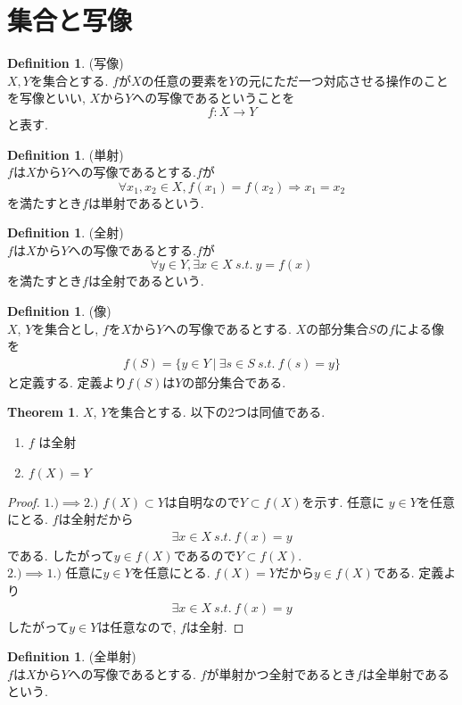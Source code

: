\documentclass[11pt, a4paper, dvipdfmx]{jsbook}
\theoremstyle{definition}
\newtheorem{Definition+}[Axiom+]{Definition}
\newtheorem{Theorem+}[Axiom+]{Theorem}
\begin{document}
\section{集合と写像}
\begin{Definition+}(写像)\\
  $X, Y$を集合とする.
  $f$が$X$の任意の要素を$Y$の元にただ一つ対応させる操作のことを写像といい, $X$から$Y$への写像であるということを
  \begin{equation*}
    f : X \to Y
  \end{equation*}
  と表す.
\end{Definition+}
\begin{Definition+}(単射)\\
  $f$は$X$から$Y$への写像であるとする.$f$が
  \begin{equation*}
    \forall x_{1}, x_{2}\in X, f(x_{1}) = f(x_{2}) \Longrightarrow x_{1} = x_{2}
  \end{equation*}
  を満たすとき$f$は単射であるという.
\end{Definition+}
\begin{Definition+}(全射)\\
  $f$は$X$から$Y$への写像であるとする.$f$が
  \begin{equation*}
    \forall y \in Y, \exists x\in X ~s.t.~ y = f(x)
  \end{equation*}
  を満たすとき$f$は全射であるという.
\end{Definition+}
\begin{Definition+}(像)\\
  $X$, $Y$を集合とし, $f$を$X$から$Y$への写像であるとする. $X$の部分集合$S$の$f$による像を
  \begin{align*}
    f(S) = \{y\in Y~|~ \exists s\in S~s.t.~ f(s) = y\}
  \end{align*}
  と定義する. 定義より$f(S)$は$Y$の部分集合である.
\end{Definition+}
\begin{Theorem+}
  $X$, $Y$を集合とする. 以下の2つは同値である.
  \begin{enumerate}
    \item $f$ は全射
    \item $f(X) = Y$
  \end{enumerate}
  \begin{proof}
    $1.)\implies 2.)$ $f(X)\subset Y$は自明なので$Y\subset f(X)$を示す. 任意に
    $y\in Y$を任意にとる. $f$は全射だから
    \begin{align*}
      \exists x\in X~s.t.~ f(x) = y
    \end{align*}
    である. したがって$y\in f(X)$であるので$Y\subset f(X)$.\\
    $2.)\implies 1.)$ 任意に$y\in Y$を任意にとる. $f(X) = Y$だから$y\in f(X)$である. 定義より
    \begin{align*}
      \exists x\in X~s.t.~ f(x) = y
    \end{align*}
    したがって$y\in Y$は任意なので, $f$は全射.
  \end{proof}
\end{Theorem+}
\begin{Definition+}(全単射)\\
  $f$は$X$から$Y$への写像であるとする.
  $f$が単射かつ全射であるとき$f$は全単射であるという.
\end{Definition+}
\end{document}
